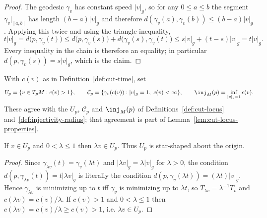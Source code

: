 \begin{proof}
\sketch
{}
\leanok
The geodesic $\gamma_v$ has constant speed $\lvert v\rvert_g$, so for any $0\le a\le b$ the
segment $\gamma_v|_{[a,b]}$ has length $(b-a)\lvert v\rvert_g$ and therefore
$d(\gamma_v(a),\gamma_v(b))\le (b-a)\lvert v\rvert_g$. Applying this twice and using the
triangle inequality,
$$t\lvert v\rvert_g=d\bigl(p,\gamma_v(t)\bigr)
\le d\bigl(p,\gamma_v(s)\bigr)+d\bigl(\gamma_v(s),\gamma_v(t)\bigr)
\le s\lvert v\rvert_g+(t-s)\lvert v\rvert_g=t\lvert v\rvert_g .$$
Every inequality in the chain is therefore an equality; in particular
$d(p,\gamma_v(s))=s\lvert v\rvert_g$, which is the claim.
\end{proof}

\begin{definition}
\label{def:cut-time-locus}
\leanok



With $c(v)$ as in Definition~\ref{def:cut-time}, set
$$U_p=\{v\in T_pM : c(v)>1\},\qquad
{\mathcal C}_p=\{\gamma_v(c(v)) : \lvert v\rvert_g=1,\ c(v)<\infty\},\qquad
\inj_M(p)=\inf_{\lvert v\rvert_g=1} c(v).$$
These agree with the $U_p$, ${\mathcal C}_p$ and $\inj_M(p)$ of
Definitions~\ref{def:cut-locus} and~\ref{def:injectivity-radius}; that agreement is part of
Lemma~\ref{lem:cut-locus-properties}.
\end{definition}

\begin{lemma}
\label{lem:segment-domain-star-shaped}
\leanok



If $v\in U_p$ and $0<\lambda\le1$ then $\lambda v\in U_p$. Thus $U_p$ is star-shaped about
the origin.
\end{lemma}

\begin{proof}
\sketch
{}
\leanok
Since $\gamma_{\lambda v}(t)=\gamma_v(\lambda t)$ and
$\lvert \lambda v\rvert_g=\lambda\lvert v\rvert_g$ for $\lambda>0$, the condition
$d(p,\gamma_{\lambda v}(t))=t\lvert\lambda v\rvert_g$ is literally the condition
$d(p,\gamma_v(\lambda t))=(\lambda t)\lvert v\rvert_g$. Hence $\gamma_{\lambda v}$ is
minimizing up to $t$ iff $\gamma_v$ is minimizing up to $\lambda t$, so
$T_{\lambda v}=\lambda^{-1}T_v$ and $c(\lambda v)=c(v)/\lambda$. If $c(v)>1$ and
$0<\lambda\le 1$ then $c(\lambda v)=c(v)/\lambda\ge c(v)>1$, i.e. $\lambda v\in U_p$.
\end{proof}

